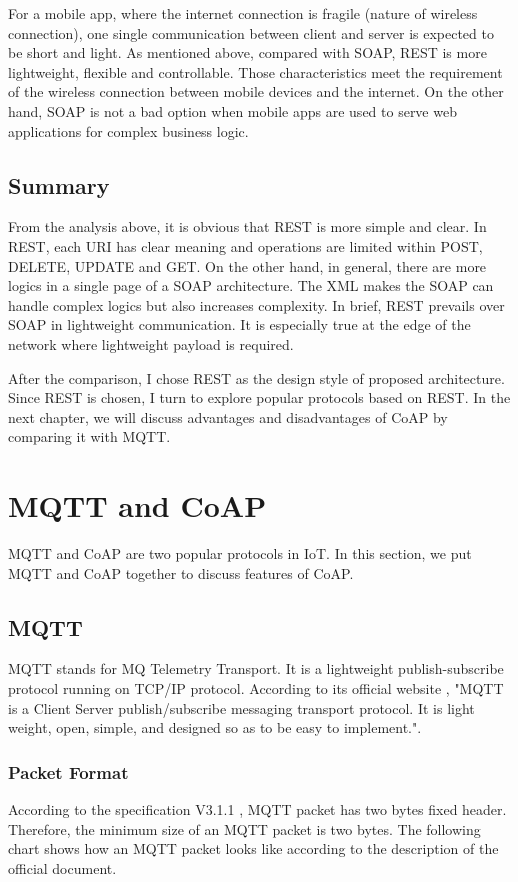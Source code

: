 \documentclass{Nan_Thesis}
\begin{document}
For a mobile app, where the internet connection is fragile (nature of wireless connection), one single communication between client and server is expected to be short and light.  As mentioned above, compared with SOAP, REST is more lightweight, flexible and controllable. Those characteristics meet the requirement of the wireless connection between mobile devices and the internet. On the other hand, SOAP is not a bad option when mobile apps are used to serve web applications for complex business logic.
\subsection{Summary}

From the analysis above, it is obvious that REST is more simple and clear. In REST, each URI has clear meaning and operations are limited within POST, DELETE, UPDATE and GET. On the other hand, in general, there are more logics in a single page of a SOAP architecture. The XML makes the SOAP can handle complex logics but also increases complexity. In brief, REST prevails over SOAP in lightweight communication. It is especially true at the edge of the network where lightweight payload is required.

After the comparison, I chose REST as the design style of proposed architecture. Since REST is chosen, I turn to explore popular protocols based on REST.
In the next chapter, we will discuss advantages and disadvantages of CoAP by comparing it with MQTT.
\section{MQTT and CoAP}
MQTT and CoAP are two popular protocols in IoT. In this section, we put MQTT and CoAP together to discuss features of CoAP.
\subsection{MQTT}
MQTT stands for MQ Telemetry Transport. It is a lightweight publish-subscribe protocol running on TCP/IP protocol. According to its official website \cite{banks2014mqtt}, "MQTT is a Client Server publish/subscribe messaging transport protocol. It is light weight, open, simple, and designed so as to be easy to implement.".

\subsubsection{Packet Format} 
According to the specification V3.1.1 \cite{banks2014mqtt}, MQTT packet has two bytes fixed header. Therefore, the minimum size of an MQTT packet is two bytes. The following chart shows how an MQTT packet looks like according to the description of the official document.
\end{document}
